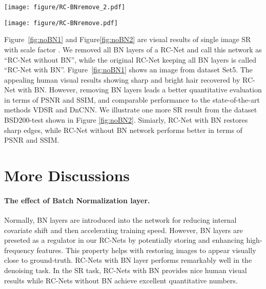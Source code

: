 \documentclass[10pt,twocolumn,letterpaper]{article}
\begin{document}
\begin{figure*}
 \caption{\small \textbf{Super-resolution:} Visual results of one image from Set 5 with a scale factor of  along with PSNR(dB) / SSIM. ROIs show the improved human visual results using RC-Net with BN by restoring sharp and clean contour of the hair. When comparing PSNR and SSIM, RC-Net without BN \textit{outperforms} VDSR. }
  \texttt{[image: figure/RC-BNremove\_2.pdf]}
\label{fig:noBN1}
\end{figure*}

\begin{figure*}
  \caption{\small \textbf{Super-resolution:} Visual results of one image from B100 (100 images from BSD200-test dataset) with scale factor of  along with PSNR(dB) / SSIM. Similarly, RC-Net with BN outperforms other methods in restoring sharp details. RC-Net without BN performs excellently on generating image with improved PSNR and SSIM.}
  \texttt{[image: figure/RC-BNremove.pdf]}
\label{fig:noBN2}
\end{figure*}
 
 Figure~\ref{fig:noBN1} and Figure\ref{fig:noBN2} are visual results of single image SR with scale factor . We removed all BN layers of a RC-Net and call this network as ``RC-Net without BN'', while the original RC-Net keeping all BN layers is called ``RC-Net with BN''. Figure~\ref{fig:noBN1} shows an image from dataset Set5.  The appealing human visual results showing sharp and bright hair recovered by RC-Net with BN. However, removing BN layers leads a better quantitative evaluation in terms of PSNR and SSIM, and comparable performance to the state-of-the-art methods VDSR and DnCNN. We illustrate one more SR result from the dataset BSD200-test shown in Figure \ref{fig:noBN2}. Simiarly, RC-Net with BN restores sharp edges, while RC-Net without BN network performs better in terms of PSNR and SSIM.
\section{More Discussions}
\paragraph{The effect of Batch Normalization layer.}
Normally, BN layers are introduced into the network for reducing internal covariate shift and then accelerating training speed. However, BN layers are preseted as a regulator in our RC-Nets by potentially storing and enhancing high-frequency features. This property helps with restoring images to appear visually close to ground-truth. RC-Nets with BN layer performs remarkably well in the denoising task. In the SR task, RC-Nets with BN provides nice human visual results while RC-Nets without BN achieve excellent quantitative numbers. 
\end{document}
